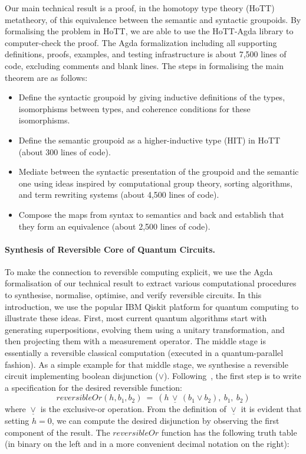 Our main technical result is a proof, in the homotopy type theory (HoTT) metatheory, of this equivalence between the
semantic and syntactic groupoids. By formalising the problem in HoTT, we are able to use the HoTT-Agda library to
computer-check the proof. The Agda formalization including all supporting definitions, proofs, examples, and testing
infrastructure is about 7,500 lines of code, excluding comments and blank lines. The steps in formalising the main
theorem are as follows:
\begin{itemize}
\item Define the syntactic groupoid by giving inductive definitions of the types, isomorphisms between types, and
  coherence conditions for these isomorphisms.
\item Define the semantic groupoid as a higher-inductive type (HIT) in HoTT (about 300 lines of code).
\item Mediate between the syntactic presentation of the groupoid and the semantic one using ideas inspired by computational
  group theory, sorting algorithms, and term rewriting systems (about 4,500 lines of code).
\item Compose the maps from syntax to semantics and back and establish that they form an equivalence (about 2,500 lines
  of code).
\end{itemize}

\paragraph*{Synthesis of Reversible Core of Quantum Circuits.} To make the connection to reversible computing explicit,
we use the Agda formalisation of our technical result to extract various computational procedures to synthesise,
normalise, optimise, and verify reversible circuits. In this introduction, we use the popular IBM Qiskit platform for
quantum computing to illustrate these ideas. First, most current quantum algorithms start with generating
superpositions, evolving them using a unitary transformation, and then projecting them with a measurement operator. The
middle stage is essentially a reversible classical computation (executed in a quantum-parallel fashion). As a simple
example for that middle stage, we synthesise a reversible circuit implementing boolean disjunction
($\vee$). Following~\citet{Toffoli:1980}, the first step is to write a specification for the desired reversible
function:
\[
\mathit{reversibleOr}(h,b_1,b_2) ~=~ (h \,\underline{\vee}\, (b_1 \vee b_2), ~b_1, ~b_2)
\]
where $\underline{\vee}$ is the exclusive-or operation. From the definition of $\underline{\vee}$ it is evident that setting $h=0$, we can compute the desired disjunction by observing the first component of the result. The $\mathit{reversibleOr}$ function has the following truth table (in binary on the left and in a more convenient decimal notation on the right):

